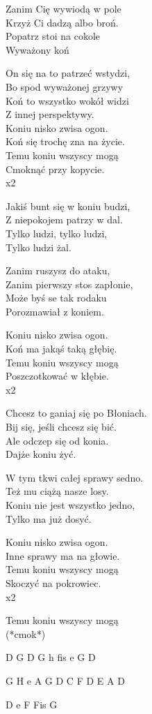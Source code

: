 \begin{text}
Zanim Cię wywiodą w pole\\
Krzyż Ci dadzą albo broń.\\
Popatrz stoi na cokole\\
Wyważony koń

On się na to patrzeć wstydzi,\\
Bo spod wyważonej grzywy \\
Koń to wszystko wokół widzi\\
Z innej perspektywy.\\

Koniu nisko zwisa ogon.\\
Koń się trochę zna na życie.\\
Temu koniu wszyscy mogą\\
Cmoknąć przy kopycie.\\
x2

Jakiś bunt się w koniu budzi,\\
Z niepokojem patrzy w dal.\\
Tylko ludzi, tylko ludzi,\\
Tylko ludzi żal.

Zanim ruszysz do ataku,\\
Zanim pierwszy stos zapłonie,\\
Może byś se tak rodaku\\
Porozmawiał z koniem.

Koniu nisko zwisa ogon.\\
Koń ma jakąś taką głębię.\\
Temu koniu wszyscy mogą\\
Poszczotkować w kłębie.\\
x2

Chcesz to ganiaj się po Błoniach.\\
Bij się, jeśli chcesz się bić.\\
Ale odczep się od konia.\\
Dajże koniu żyć.

W tym tkwi całej sprawy sedno.\\
Też mu ciążą nasze losy.\\
Koniu nie jest wszystko jedno,\\
Tylko ma już dosyć.

Koniu nisko zwisa ogon.\\
Inne sprawy ma na głowie.\\
Temu koniu wszyscy mogą\\
Skoczyć na pokrowiec.\\
x2

Temu koniu wszyscy mogą\\
(*cmok*)
\end{text}
\begin{chord}
D G
D G
h fis e G D

G H
e A G
D C F D
E A D

D e F Fis G
\end{chord}
